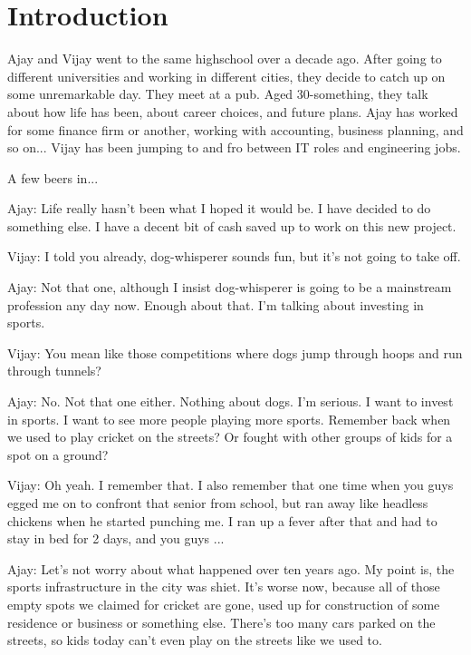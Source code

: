 \chapter{Introduction}\label{chap:introduction}

{\color{purple} {\color{blue} Ajay} and {\color{black} Vijay} went to the same highschool over a decade ago. After going to different universities and working in different cities, they decide to catch up on some unremarkable day. They meet at a pub. Aged 30-something, they talk about how life has been, about career choices, and future plans. {\color{blue}Ajay} has worked for some finance firm or another, working with accounting, business planning, and so on... {\color{black} Vijay} has been jumping to and fro between IT roles and engineering jobs.

A few beers in...}

{\color{blue} Ajay: Life really hasn't been what I hoped it would be. I have decided to do something else. I have a decent bit of cash saved up to work on this new project.} 

Vijay: I told you already, dog-whisperer sounds fun, but it's not going to take off. 

{\color{blue} Ajay: Not that one, although I insist dog-whisperer is going to be a mainstream profession any day now. Enough about that. I'm talking about investing in sports.}

Vijay: You mean like those competitions where dogs jump through hoops and run through tunnels? 

{\color{blue} Ajay: No. Not that one either. Nothing about dogs. I'm serious. I want to invest in sports. I want to see more people playing more sports. Remember back when we used to play cricket on the streets? Or fought with other groups of kids for a spot on a ground?}

Vijay: Oh yeah. I remember that. I also remember that one time when you guys egged me on to confront that senior from school, but ran away like headless chickens when he started punching me. I ran up a fever after that and had to stay in bed for 2 days, and you guys ...

{\color{blue} Ajay: Let's not worry about what happened over ten years ago. My point is, the sports infrastructure in the city was shiet. It's worse now, because all of those empty spots we claimed for cricket are gone, used up for construction of some residence or business or something else. There's too many cars parked on the streets, so kids today can't even play on the streets like we used to.}

